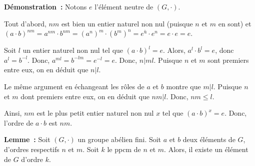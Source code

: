 \medskip

\noindent\textbf{Démonstration :} 
    Notons $e$ l'élément neutre de $(G, \cdot)$.

    Tout d'abord, $n m$ est bien un entier naturel non nul (puisque $n$ et $m$ en sont) et $(a \cdot b)^{n m} = a^{n m} \cdot b^{n m} = (a^n)^m \cdot (b^m)^n = e^ù \cdot e^n = e \cdot e = e$.

    Soit $l$ un entier naturel non nul tel que $(a \cdot b)^l = e$.
    Alors, $a^l \cdot b^l = e$, donc $a^l = b^{-l}$. 
    Donc, $a^{m l} = b^{- l m} = e^{-l} = e$.
    Donc, $n \vert m l$.
    Puisque $n$ et $m$ sont premiers entre eux, on en déduit que $n \vert l$. 

    Le même argument en échangeant les rôles de $a$ et $b$ montre que $m \vert l$.
    Puisque $n$ et $m$ dont premiers entre eux, on en déduit que $n m \vert l$.
    Donc, $n m \leq l$. 

    Ainsi, $n m$ est le plus petit entier naturel non nul $x$ tel que $(a \cdot b)^x = e$.
    Donc, l'ordre de $a \cdot b$ est $n m$.

    \done

\medskip

\noindent\textbf{Lemme :} Soit $(G, \cdot)$ un groupe abélien fini.
    Soit $a$ et $b$ deux éléments de $G$, d'ordres respectifs $n$ et $m$. 
    Soit $k$ le ppcm de $n$ et $m$. 
    Alors, il existe un élément de $G$ d'ordre $k$.
